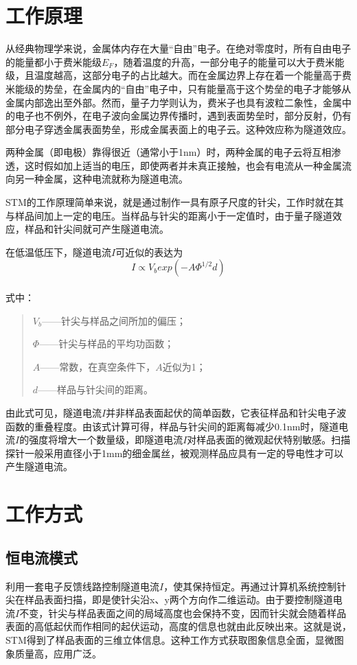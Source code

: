 \documentclass[12pt,a4paper]{ctexart}
\begin{document}
\section{工作原理}
从经典物理学来说，金属体内存在大量“自由”电子。在绝对零度时，所有自由电子的能量都小于费米能级$E_{F}$，随着温度的升高，一部分电子的能量可以大于费米能级，且温度越高，这部分电子的占比越大。而在金属边界上存在着一个能量高于费米能级的势垒，在金属内的“自由”电子中，只有能量高于这个势垒的电子才能够从金属内部逸出至外部。然而，量子力学则认为，费米子也具有波粒二象性，金属中的电子也不例外，在电子波向金属边界传播时，遇到表面势垒时，部分反射，仍有部分电子穿透金属表面势垒，形成金属表面上的电子云。这种效应称为隧道效应。

两种金属（即电极）靠得很近（通常小于1nm）时，两种金属的电子云将互相渗透，这时假如加上适当的电压，即使两者并未真正接触，也会有电流从一种金属流向另一种金属，这种电流就称为隧道电流。

STM的工作原理简单来说，就是通过制作一具有原子尺度的针尖，工作时就在其与样品间加上一定的电压。当样品与针尖的距离小于一定值时，由于量子隧道效应，样品和针尖间就可产生隧道电流。

在低温低压下，隧道电流$I$可近似的表达为\[I\propto V_{b}exp(-A \Phi^{1/2}d)\]\\
式中：
\begin{quote}
	$V_{b}$——针尖与样品之间所加的偏压；

	$\Phi$——针尖与样品的平均功函数；

	$A$——常数，在真空条件下，$A$近似为1；

	$d$——样品与针尖间的距离。
\end{quote}

由此式可见，隧道电流$I$并非样品表面起伏的简单函数，它表征样品和针尖电子波函数的重叠程度。由该式计算可得，样品与针尖间的距离每减少0.1nm时，隧道电流$I$的强度将增大一个数量级，即隧道电流$I$对样品表面的微观起伏特别敏感。扫描探针一般采用直径小于1mm的细金属丝，被观测样品应具有一定的导电性才可以产生隧道电流。

\section{工作方式}
\subsection{恒电流模式}
利用一套电子反馈线路控制隧道电流$I$，使其保持恒定。再通过计算机系统控制针尖在样品表面扫描，即是使针尖沿x、y两个方向作二维运动。由于要控制隧道电流$I$不变，针尖与样品表面之间的局域高度也会保持不变，因而针尖就会随着样品表面的高低起伏而作相同的起伏运动，高度的信息也就由此反映出来。这就是说，STM得到了样品表面的三维立体信息。这种工作方式获取图象信息全面，显微图象质量高，应用广泛。
\end{document}
